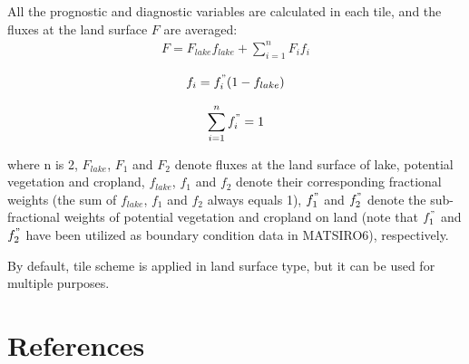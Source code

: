 All the prognostic and diagnostic variables are calculated in each tile, and the fluxes at the land surface \(F\) are averaged: \begin{eqnarray}
F=F_{lake}f_{lake}+\sum_{i=1}^nF_if_i
\end{eqnarray}

\begin{eqnarray}
f_i=f_i^"(1-f_{lake})
\end{eqnarray}

\begin{eqnarray}
\sum_{i=1}^nf_i^"=1
\end{eqnarray}

where n is 2, \(F_{lake}\), \(F_1\) and \(F_2\) denote fluxes at the land surface of lake, potential vegetation and cropland, \(f_{lake}\), \(f_1\) and \(f_2\) denote their corresponding fractional
weights (the sum of \(f_{lake}\), \(f_1\) and \(f_2\) always equals 1), \(f_1^"\) and \(f_2^"\) denote the sub-fractional weights of potential vegetation and cropland on land (note that \(f_1^"\) and
\(f_2^"\) have been utilized as boundary condition data in MATSIRO6), respectively.

By default, tile scheme is applied in land surface type, but it can be used for multiple purposes.

\hypertarget{references}{%
\section{References}\label{references}}

